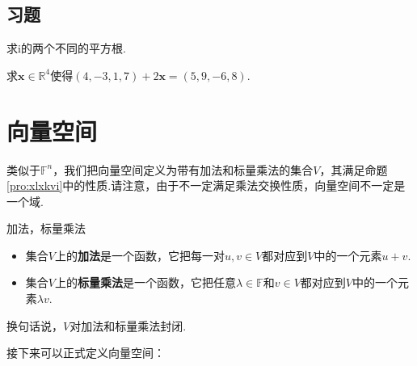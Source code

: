 \documentclass[lang=cn, zihao=5]{elegantbook}
\newcommand{\R}{\mathbb{R}}
\newcommand{\F}{\mathbb{F}}
\newcommand{\ic}{\text{i}}
\begin{document}
\subsection*{习题}
\begin{exercise}
	求$\ic $的两个不同的平方根.
\end{exercise}
\begin{exercise}
	求$\boldsymbol{x} \in \R ^{4}$使得$(4,-3,1,7) + 2\boldsymbol{x} = (5,9,-6,8)$.
\end{exercise}


\newpage
\section{向量空间}

类似于$\F ^{n}$，我们把向量空间定义为带有加法和标量乘法的集合$V$，其满足命题\ref{pro:xlxkvi}中的性质.请注意，由于不一定满足乘法交换性质，向量空间不一定是一个域.

\begin{definition}{加法，标量乘法}
	\begin{itemize}
		\item 集合$V$上的\textbf{加法}是一个函数，它把每一对$u,v \in V$都对应到$V$中的一个元素$u+v$.
		\item 集合$V$上的\textbf{标量乘法}是一个函数，它把任意$\lambda \in \F $和$v \in V$都对应到$V$中的一个元素$\lambda v$.
	\end{itemize}
\end{definition}
\begin{remark}
	换句话说，$V$对加法和标量乘法封闭.
\end{remark}

接下来可以正式定义向量空间：
\end{document}
